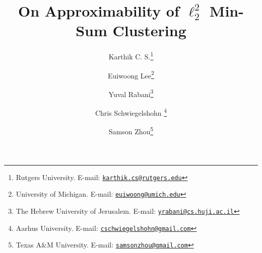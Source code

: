 \documentclass[11pt]{article}
\providecommand{\email}[1]{\href{mailto:#1}{\nolinkurl{#1}\xspace}}
\begin{document}
\allowdisplaybreaks

\title{On Approximability of $\ell_2^2$ Min-Sum Clustering}

\author{
\hspace{0.4in}
Karthik C. S.\thanks{Rutgers University.
E-mail: \email{karthik.cs@rutgers.edu}}
\hspace{0.4in}
\and 
Euiwoong Lee\thanks{University of Michigan. 
E-mail: \email{euiwoong@umich.edu}}
\hspace{0.4in}
\and 
Yuval Rabani\thanks{The Hebrew University of Jerusalem. 
E-mail: \email{yrabani@cs.huji.ac.il}}
\hspace{0.4in}
\vspace{-0.2in}
\and 
Chris Schwiegelshohn
\thanks{Aarhus University. 
E-mail: \email{cschwiegelshohn@gmail.com}} 
\and 
Samson Zhou\thanks{Texas A\&M University. 
E-mail: \email{samsonzhou@gmail.com}}
}
\date{}

\maketitle
\end{document}
